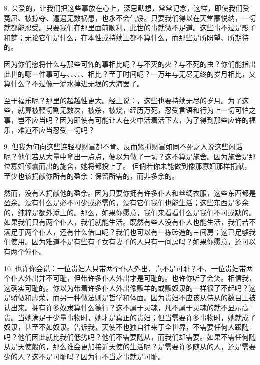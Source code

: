 8. 亲爱的，让我们把这些事放在心上，深思默想，常常记念，这样，即使我们受冤屈、被掠夺、遭遇无数祸患，也永不会气馁。只要我们得以在天堂蒙悦纳，一切就都能忍受。只要我们在那里面前顺利，此世的事就微不足道。这些事不过是影子和梦；无论它们是什么，在本性或持续上都不算什么，而那些是所盼望、所期待的。\par

因为你们愿将什么与那些可怖的事相比呢？与不灭的火？与不死的虫？你们能指出此世的哪一件事可与、、、、、相比？至于时间呢？一万年与无尽无终的岁月相比，又算什么？不过像一滴水掉进无垠的大海罢了。\par

至于福乐呢？那里的超越性更大。经上说：，这些也要持续无尽的岁月。为了这些，就算被鞭切割无数次，被杀，被烧，经历万死，忍受言语和行为上一切可怕之事，岂不应当吗？因为即使有可能让人在火中活着活下去，为了得到那些应许的福乐，难道不应当忍受一切吗？\par

9. 但我为何向这些连轻视财富都不肯、反而紧抓财富如同不死之人说这些闲话呢？他们若从大量中拿出一点点，便以为做了一切？这不算是施舍。因为施舍是那位寡妇倾囊而出的施舍，她将都投上了。 但倘若你未能做到像那寡妇那样捐献，至少也该捐献你所有的盈余：保留所需的，而非多余的。\par

然而，没有人捐献他的盈余。因为只要你拥有许多仆人和丝绸衣服，这些东西都是盈余。没有什么是必不可少或必需的，没有它们我们也能生活；这些东西是多余的，纯粹是额外添上的。那么，如果你愿意，我们来看看什么是我们不可或缺的。如果我们只有两个仆人，我们就能生活。既然有些人没有仆人也能生活，我们若不满足于两个仆人，还有什么借口呢？我们也可以有一栋砖造的三间房；这已足够我们使用。因为难道不是有些有子女有妻子的人只有一间房吗？如果你愿意，还可以有两个僮仆。\par

10. 也许你会说：一位贵妇人只带两个仆人外出，岂不是可耻？不，一位贵妇带两个仆人外出并不可耻，但带许多仆人外出才是可耻的。也许你听了会笑。相信我，这确实可耻的。你以为带着许多仆人外出像贩羊的或贩奴隶的一样很了不起吗？这是骄傲和虚荣，而另一种做法则是哲学和体面。因为贵妇不应该从侍从的数目上被认出来。拥有许多奴隶算什么德行？这不属于灵魂，凡不属于灵魂的就不显示高贵。当她满足于少量事物时，她才是真正的贵妇；但当需要许多事物时，她就成了奴隶，甚至不如奴隶。告诉我，天使不也独自往来于全世界，不需要任何人跟随吗？他们因此就比我们低劣吗？他们不需要随从，而我们却需要。如果不需任何随从是天使般的，那么谁会更加接近天使的生活呢？是需要许多随从的人，还是需要少的人？这不是可耻吗？因为行不当之事就是可耻。\par

